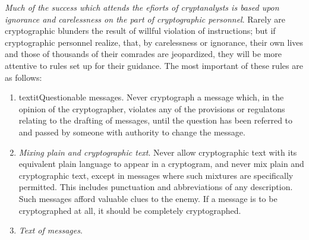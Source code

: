 \mypara \textit{Much of the success which attends the eﬁorts of cryptanalysts is
based upon ignorance and carelessness on the part of cryptographic personnel}. Rarely are cryptographic blunders the result of willful violation
of instructions; but if cryptographic personnel realize, that, by carelessness or ignorance, their own lives and those of thousands of their comrades are jeopardized, they will be more attentive to rules set up for their
guidance. The most important of these rules are as follows:
\begin{enumerate}
\item textit{Questionable messages}. Never cryptograph a message which, in
the opinion of the cryptographer, violates any of the provisions
or regulatons relating to the drafting of messages, until the
question has been referred to and passed by someone with
authority to change the message.

\item \textit{Mixing plain and cryptographic text}. Never allow cryptographic
text with its equivalent plain language to appear in a cryptogram, and never mix plain and cryptographic text, except in
messages where such mixtures are speciﬁcally permitted. This
includes punctuation and abbreviations of any description. Such
messages afford valuable clues to the enemy. If a message is to
be cryptographed at all, it should be completely cryptographed.

\item \textit{Text of messages}.


\end{enumerate}
